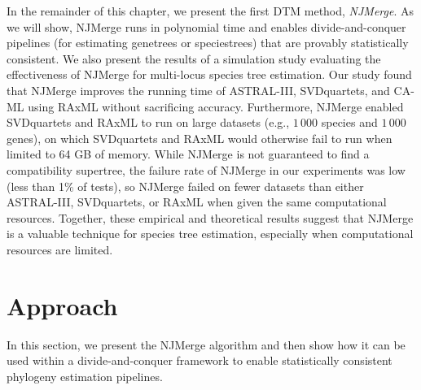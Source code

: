 In the remainder of this chapter, we present the first DTM method, \textit{\gls{NJMerge}}.
As we will show, NJMerge runs in polynomial time and enables divide-and-conquer pipelines (for estimating \glspl{genetree} or \glspl{speciestree}) that are provably statistically consistent.
We also present the results of a simulation study evaluating the effectiveness of 
NJMerge for multi-locus species tree estimation.
Our study found that NJMerge improves the running time of ASTRAL-III, SVDquartets, and CA-ML using RAxML without sacrificing accuracy.
Furthermore, NJMerge enabled SVDquartets and RAxML to run on large datasets (e.g., $1\,000$ species and $1\,000$ genes), on which SVDquartets and RAxML would otherwise fail to run when limited to 64 GB of memory.
While NJMerge is not guaranteed to find a compatibility supertree, the failure rate of NJMerge in our experiments was low (less than 1\% of tests), so NJMerge failed on fewer datasets than either ASTRAL-III, SVDquartets, or RAxML when given the same computational resources.
Together, these empirical and theoretical results suggest that NJMerge is a valuable technique for species tree estimation, especially when computational resources are limited.

\section{Approach}
\label{sec:njmerge-approach}
In this section, we present the NJMerge algorithm and then show how it can be used within a divide-and-conquer framework to enable statistically consistent phylogeny estimation pipelines.

